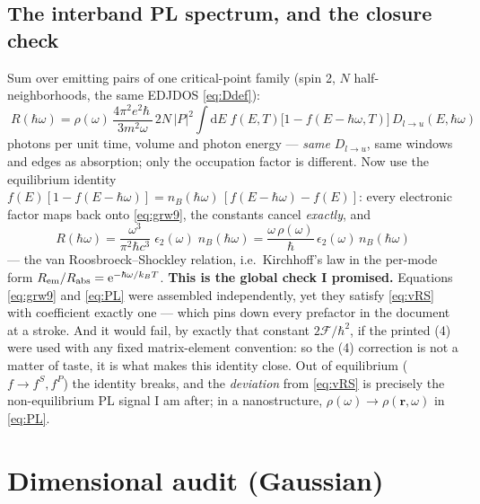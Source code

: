 \documentclass[11pt,a4paper]{article}
\numberwithin{equation}{section}
\newcommand{\hw}{\hbar\omega}
\newcommand{\cF}{\mathcal{F}}
\newcommand{\dd}{\mathrm{d}}
\newcommand{\rme}{\mathrm{e}}
\begin{document}
\subsection{The interband PL spectrum, and the closure check}

Sum over emitting pairs of one critical-point family (spin 2, $N$
half-neighborhoods, the same EDJDOS \eqref{eq:Ddef}):
\begin{equation}
\boxed{\;
R(\hw)=\rho(\omega)\,
\frac{4\pi^2e^2\hbar\,}{3m^2\omega}\,
2N\,|P|^2
\int\!\dd E\;
f(E,T)\bigl[1-f(E-\hw,T)\bigr]\,D_{l\to u}(E,\hw)
\;}
\label{eq:PL}
\end{equation}
photons per unit time, volume and photon energy --- \emph{same}
$D_{l\to u}$, same windows and edges as absorption; only the
occupation factor is different. Now use the equilibrium identity
$f(E)[1-f(E-\hw)]=n_B(\hw)\,[f(E-\hw)-f(E)]$: every
electronic factor maps back onto \eqref{eq:grw9}, the constants cancel
\emph{exactly}, and
\begin{equation}
\boxed{\;
R(\hw)=\frac{\omega^3}{\pi^2\hbar c^3}\;
\epsilon_2(\omega)\;n_B(\hw)
=\frac{\omega\,\rho(\omega)}{\hbar}\,\epsilon_2(\omega)\,n_B(\hw)
\;}
\label{eq:vRS}
\end{equation}
--- the van Roosbroeck--Shockley relation, i.e.\ Kirchhoff's law in
the per-mode form $R_{\rm em}/R_{\rm abs}=\rme^{-\hw/k_BT}$.
\textbf{This is the global check I promised.} Equations \eqref{eq:grw9}
and \eqref{eq:PL} were assembled independently, yet they satisfy
\eqref{eq:vRS} with coefficient exactly one --- which pins down every
prefactor in the document at a stroke. And it would fail, by exactly
that constant $2\cF/\hbar^2$, if the printed (4) were used with any
fixed matrix-element convention: so the (4) correction is not a matter
of taste, it is what makes this identity close. Out of equilibrium
($f\to f^S,f^P$) the identity breaks, and the \emph{deviation} from
\eqref{eq:vRS} is precisely the non-equilibrium PL signal I am after;
in a nanostructure, $\rho(\omega)\to\rho(\mathbf r,\omega)$ in
\eqref{eq:PL}.

\appendix
\section{Dimensional audit (Gaussian)}
\end{document}
